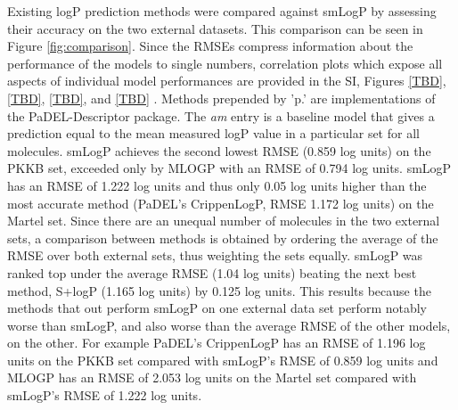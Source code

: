 \documentclass[10pt]{bmc_article}
\newenvironment{bmcformat}{\begin{raggedright}\baselineskip20pt\sloppy\setboolean{publ}{false}}{\end{raggedright}\baselineskip20pt\sloppy}
\begin{document}
\begin{bmcformat}
Existing logP prediction methods were compared against smLogP by assessing their accuracy on the two external datasets. This comparison can be seen in Figure \ref{fig:comparison}. Since the RMSEs compress information about the performance of the models to single numbers, correlation plots which expose all aspects of individual model performances are provided in the SI, Figures \ref{TBD}, \ref{TBD}, \ref{TBD}, and \ref{TBD} . Methods prepended by 'p.' are implementations of the PaDEL-Descriptor package. The \textit{am} entry is a baseline model that gives a prediction equal to the mean measured logP value in a particular set for all molecules. smLogP achieves the second lowest RMSE (0.859 log units) on the PKKB set, exceeded only by MLOGP with an RMSE of 0.794 log units.  smLogP has an RMSE of 1.222 log units and thus only 0.05 log units higher than the most accurate method (PaDEL's CrippenLogP, RMSE 1.172 log units) on the Martel set. Since there are an unequal number of molecules in the two external sets, a comparison between methods is obtained by ordering the average of the RMSE over both external sets, thus weighting the sets equally. smLogP was ranked top under the average RMSE (1.04 log units) beating the next best method, S+logP (1.165 log units) by 0.125 log units. This results because the methods that out perform smLogP on one external data set perform notably worse than smLogP, and also worse than the average RMSE of the other models, on the other. For example PaDEL's CrippenLogP has an RMSE of 1.196 log units on the PKKB set compared with smLogP's RMSE of 0.859 log units and MLOGP has an RMSE of 2.053 log units on the Martel set compared with smLogP's RMSE of 1.222 log units.


\end{bmcformat}
\end{document}
